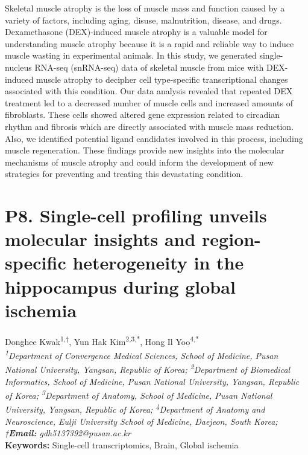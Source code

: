 \noindent
Skeletal muscle atrophy is the loss of muscle mass and function caused by a variety of factors, including aging, disuse, malnutrition, disease, and drugs. Dexamethasone (DEX)-induced muscle atrophy is a valuable model for understanding muscle atrophy because it is a rapid and reliable way to induce muscle wasting in experimental animals. In this study, we generated single-nucleus RNA-seq (snRNA-seq) data of skeletal muscle from mice with DEX-induced muscle atrophy to decipher cell type-specific transcriptional changes associated with this condition. Our data analysis revealed that repeated DEX treatment led to a decreased number of muscle cells and increased amounts of fibroblasts. These cells showed altered gene expression related to circadian rhythm and fibrosis which are directly associated with muscle mass reduction. Also, we identified potential ligand candidates involved in this process, including muscle regeneration. These findings provide new insights into the molecular mechanisms of muscle atrophy and could inform the development of new strategies for preventing and treating this devastating condition.
\newpage

\section*{P8. Single-cell profiling unveils molecular insights and region-specific heterogeneity in the hippocampus during global ischemia}

\begin{center}
Donghee Kwak\textsuperscript{1,†}, Yun Hak Kim\textsuperscript{2,3,*}, Hong Il Yoo\textsuperscript{4,*} \\
\vspace{0.3cm}
\textit{\textsuperscript{1}Department of Convergence Medical Sciences, School of Medicine, Pusan National University, Yangsan, Republic of Korea; \textsuperscript{2}Department of Biomedical Informatics, School of Medicine, Pusan National University, Yangsan, Republic of Korea; \textsuperscript{3}Department of Anatomy, School of Medicine, Pusan National University, Yangsan, Republic of Korea; \textsuperscript{4}Department of Anatomy and Neuroscience, Eulji University School of Medicine, Daejeon, South Korea; †\textbf{Email:} gdh5137392@pusan.ac.kr} \\
\vspace{0.3cm}
\textbf{Keywords:} Single-cell transcriptomics, Brain, Global ischemia
\end{center}

